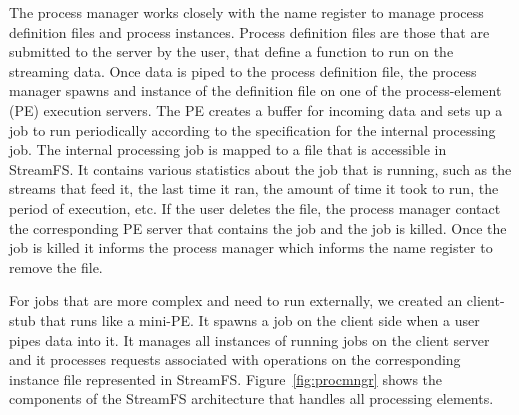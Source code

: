 The process manager works closely with the name register to manage process definition files and process instances.  Process definition files
are those that are submitted to the server by the user, that define a function to run on the streaming data.  Once data is piped to the process
definition file, the process manager spawns and instance of the definition file on one of the process-element (PE) execution servers.  The PE
creates a buffer for incoming data and sets up a job to run periodically according to the specification for the internal processing job.
The internal processing job is mapped to a file that is accessible in StreamFS.  It contains various statistics about the job that is running, such
as the streams that feed it, the last time it ran, the amount of time it took to run, the period of execution, etc.
If the user deletes the file, the process manager contact the corresponding PE server that contains the job and the job is killed.  Once the job
is killed it informs the process manager which informs the name register to remove the file.

For jobs that are more complex and need to run externally, we created an client-stub that runs like a mini-PE.  It spawns a job on the client
side when a user pipes data into it.  It manages all instances of running jobs on the client server and it processes requests associated with
operations on the corresponding instance file represented in StreamFS.  Figure~\ref{fig:procmngr} shows the components of the StreamFS architecture
that handles all processing elements.















